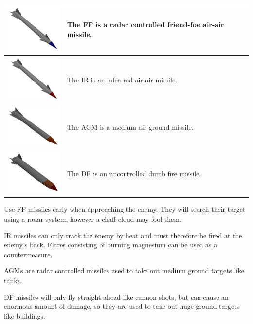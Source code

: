\begin{center}
\begin{tabular}{|c|l|}
\hline
\includegraphics[width=3cm]{missile_ff.jpg} &
The FF is a radar controlled friend-foe air-air missile.\\
\hline
\includegraphics[width=3cm]{missile_ir.jpg} &
The IR is an infra red air-air missile.\\
\hline
\includegraphics[width=3cm]{missile_agm.jpg} &
The AGM is a medium air-ground missile.\\
\hline
\includegraphics[width=3cm]{missile_df.jpg} &
The DF is an uncontrolled dumb fire missile.\\
\hline
\end{tabular}
\end{center}

Use FF missiles early when approaching the enemy.
They will search their target using a radar system,
however a chaff cloud may fool them.

IR missiles can only track the enemy by heat and must
therefore be fired at the enemy's back.
Flares consisting of burning magnesium can be used as a countermeasure.

AGMs are radar controlled missiles used to
take out medium ground targets like tanks.

DF missiles will only fly straight ahead like cannon shots,
but can cause an enormous amount of damage,
so they are used to take out huge ground targets like buildings.
